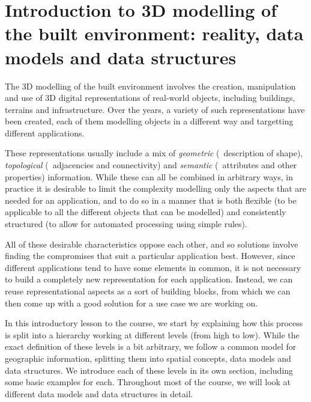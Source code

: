 
\setchapterpreamble[u]{\margintoc}

\graphicspath{{dmds/}}

\chapter{Introduction to 3D modelling of the built environment: reality, data models and data structures}%
\label{chap:dmds}


The 3D modelling of the built environment involves the creation, manipulation and use of 3D digital representations of real-world objects, including buildings, terrains and infrastructure.
Over the years, a variety of such representations have been created, each of them modelling objects in a different way and targetting different applications.


These representations usually include a mix of \emph{geometric} (\ie\ description of shape), \emph{topological} (\ie\ adjacencies and connectivity) and \emph{semantic} (\ie\ attributes and other properties) information.
While these can all be combined in arbitrary ways, in practice it is desirable to limit the complexity modelling only the aspects that are needed for an application, and to do so in a manner that is both flexible (to be applicable to all the different objects that can be modelled) and consistently structured (to allow for automated processing using simple rules).


All of these desirable characteristics oppose each other, and so solutions involve finding the compromises that suit a particular application best.
However, since different applications tend to have some elements in common, it is not necessary to build a completely new representation for each application.
Instead, we can reuse representational aspects as a sort of building blocks, from which we can then come up with a good solution for a use case we are working on.


In this introductory lesson to the course, we start by explaining how this process is split into a hierarchy working at different levels (from high to low).
While the exact definition of these levels is a bit arbitrary, we follow a common model for geographic information, splitting them into spatial concepts, data models and data structures.
We introduce each of these levels in its own section, including some basic examples for each.
Throughout most of the course, we will look at different data models and data structures in detail.

